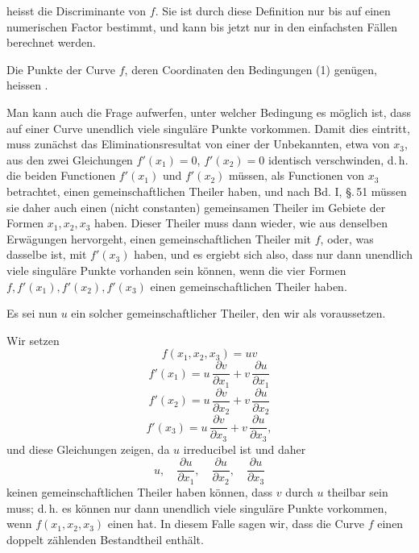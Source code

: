 heisst die Discriminante von $f$. Sie ist durch diese Definition nur bis auf einen numerischen Factor bestimmt, und kann bis jetzt nur in den einfachsten Fällen berechnet werden.

Die Punkte der Curve $f$, deren Coordinaten den Bedingungen (1) genügen, heissen .

Man kann auch die Frage aufwerfen, unter welcher Bedingung es möglich ist, dass auf einer Curve unendlich viele singuläre Punkte vorkommen. Damit dies eintritt, muss zunächst das Eliminationsresultat von einer der Unbekannten, etwa von $x_3$, aus den zwei Gleichungen $f'(x_1) = 0$, $f'(x_2) = 0$ identisch verschwinden, d.\,h. die beiden Functionen $f'(x_1)$ und $f'(x_2)$ müssen, als Functionen von $x_3$ betrachtet, einen gemeinschaftlichen Theiler haben, und nach Bd. I, \S.\,51 müssen sie daher auch einen (nicht constanten) gemeinsamen Theiler im Gebiete der Formen $x_1, x_2, x_3$ haben. Dieser Theiler muss dann wieder, wie aus denselben Erwägungen hervorgeht, einen gemeinschaftlichen Theiler mit $f$, oder, was dasselbe ist, mit $f'(x_3)$ haben, und es ergiebt sich also, dass nur dann unendlich viele singuläre Punkte vorhanden sein können, wenn die vier Formen $f, f'(x_1), f'(x_2), f'(x_3)$ einen gemeinschaftlichen Theiler haben.

Es sei nun $u$ ein solcher gemeinschaftlicher Theiler, den wir als  voraussetzen.

Wir setzen
\[
f(x_1, x_2, x_3) = uv
\]
\[
f'(x_1) = u\,\frac{\partial v}{\partial x_1} + v\,\frac{\partial u}{\partial x_1}
\]
\[
f'(x_2) = u\,\frac{\partial v}{\partial x_2} + v\,\frac{\partial u}{\partial x_2}
\]
\[
f'(x_3) = u\,\frac{\partial v}{\partial x_3} + v\,\frac{\partial u}{\partial x_3},
\]
und diese Gleichungen zeigen, da $u$ irreducibel ist und daher
\[
u, \quad \frac{\partial u}{\partial x_1}, \quad \frac{\partial u}{\partial x_2}, \quad \frac{\partial u}{\partial x_3}
\]
keinen gemeinschaftlichen Theiler haben können, dass $v$ durch $u$ theilbar sein muss; d.\,h. es können nur dann unendlich viele singuläre Punkte vorkommen, wenn $f(x_1, x_2, x_3)$ einen  hat. In diesem Falle sagen wir, dass die Curve $f$ einen doppelt zählenden Bestandtheil enthält.
